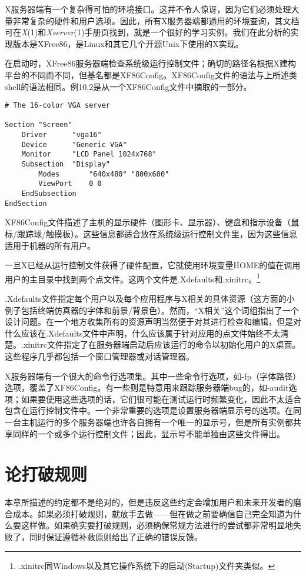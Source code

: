 \documentclass[12pt,oneside]{ctexbook}
\begin{document}
\begin{common-format}
X服务器端有一个复杂得可怕的环境接口。这并不令人惊讶，因为它们必须处理大量非常复杂的硬件和用户选项。因此，所有X服务器端都通用的环境查询，其文档可在\textit{X}(1)和\textit{Xserver}(1)手册页找到，就是一个很好的学习实例。我们在此分析的实现版本是XFree86，是Linux和其它几个开源Unix下使用的X实现。

在启动时，XFree86服务器端检查系统级运行控制文件；确切的路径名根据X建构平台的不同而不同，但基名都是XF86Config。XF86Config文件的语法与上所述类shell的语法相同。例10.2是从一个XF86Config文件中摘取的一部分。

\begin{Verbatim}[label=例10.2  X配置示例]
# The 16-color VGA server

Section "Screen"
    Driver      "vga16"
    Device      "Generic VGA"
    Monitor     "LCD Panel 1024x768"
    Subsection  "Display"
        Modes       "640x480" "800x600"
        ViewPort    0 0
    EndSubsection
EndSection
\end{Verbatim}


XF86Config文件描述了主机的显示硬件（图形卡、显示器）、键盘和指示设备（鼠标/跟踪球/触摸板）。这些信息都适合放在系统级运行控制文件里，因为这些信息适用于机器的所有用户。

一旦X已经从运行控制文件获得了硬件配置，它就使用环境变量HOME的值在调用用户的主目录中找到两个点文件。这两个文件是.Xdefaults和.xinitrc。\footnote{.xinitrc同Windows以及其它操作系统下的启动(Startup)文件夹类似。}

.Xdefaults文件指定每个用户以及每个应用程序与X相关的具体资源（这方面的小例子包括终端仿真器的字体和前景/背景色）。然而，“X相关”这个词组指出了一个设计问题。在一个地方收集所有的资源声明当然便于对其进行检查和编辑，但是对什么应该在.Xdefaults文件中声明，什么应该属于针对应用的点文件始终不太清楚。.xinitrc文件指定了在服务器端启动后应该运行的命令以初始化用户的X桌面。这些程序几乎都包括一个窗口管理器或对话管理器。

X服务器端有一个很大的命令行选项集。其中一些命令行选项，如-fp（字体路径）选项，覆盖了XF86Config。有一些则是特意用来跟踪服务器端bug的，如-audit选项；如果要使用这些选项的话，它们很可能在测试运行时频繁变化，因此不太适合包含在运行控制文件中。一个非常重要的选项是设置服务器端显示号的选项。在同一台主机运行的多个服务器端也许各自拥有一个唯一的显示号，但是所有实例都共享同样的一个或多个运行控制文件；因此，显示号不能单独由这些文件得出。

\section{论打破规则}
本章所描述的约定都不是绝对的，但是违反这些约定会增加用户和未来开发者的磨合成本。如果必须打破规则，就放手去做——但在做之前要确信自己完全知道为什么要这样做。如果确实要打破规则，必须确保常规方法进行的尝试都非常明显地失败了，同时保证遵循补救原则给出了正确的错误反馈。





\end{common-format}
\end{document}
